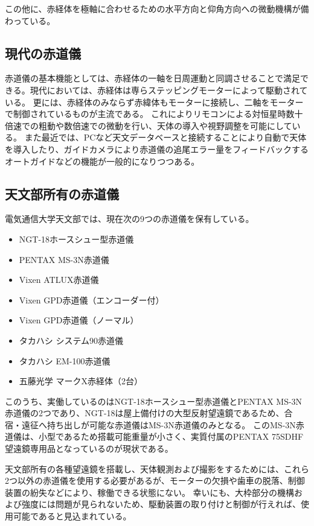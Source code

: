 \documentclass[../../main]{subfiles}
\begin{document}
この他に、赤経体を極軸に合わせるための水平方向と仰角方向への微動機構が備わっている。
\subsection{現代の赤道儀}
赤道儀の基本機能としては、赤経体の一軸を日周運動と同調させることで満足できる。現代においては、赤経体は専らステッピングモーターによって駆動されている。
更には、赤経体のみならず赤緯体もモーターに接続し、二軸をモーターで制御されているものが主流である。
これによりリモコンによる対恒星時数十倍速での粗動や数倍速での微動を行い、天体の導入や視野調整を可能にしている。
また最近では、PCなど天文データベースと接続することにより自動で天体を導入したり、ガイドカメラにより赤道儀の追尾エラー量をフィードバックするオートガイドなどの機能が一般的になりつつある。
\subsection{天文部所有の赤道儀}
電気通信大学天文部では、現在次の9つの赤道儀を保有している。
\begin{itemize}
  \item NGT-18ホースシュー型赤道儀
  \item PENTAX MS-3N赤道儀
  \item Vixen ATLUX赤道儀
  \item Vixen GPD赤道儀（エンコーダー付）
  \item Vixen GPD赤道儀（ノーマル）
  \item タカハシ システム90赤道儀
  \item タカハシ EM-100赤道儀
  \item 五藤光学 マークX赤経体（2台）
\end{itemize}
このうち、実働しているのはNGT-18ホースシュー型赤道儀とPENTAX MS-3N赤道儀の2つであり、NGT-18は屋上備付けの大型反射望遠鏡であるため、合宿・遠征へ持ち出しが可能な赤道儀はMS-3N赤道儀のみとなる。
このMS-3N赤道儀は、小型であるため搭載可能重量が小さく、実質付属のPENTAX 75SDHF望遠鏡専用品となっているのが現状である。

天文部所有の各種望遠鏡を搭載し、天体観測および撮影をするためには、これら2つ以外の赤道儀を使用する必要があるが、モーターの欠損や歯車の脱落、制御装置の紛失などにより、稼働できる状態にない。
幸いにも、大枠部分の機構および強度には問題が見られないため、駆動装置の取り付けと制御が行えれば、使用可能であると見込まれている。
\end{document}
